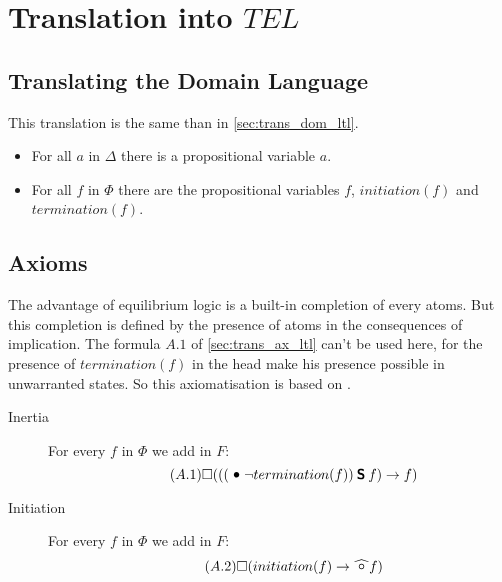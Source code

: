 \section{Translation into $TEL$}\label{sec:translation_e}

\subsection{Translating the Domain Language}

This translation is the same than in \ref{sec:trans_dom_ltl}.

\begin{itemize}
  \item For all $a$ in $\Delta$ there is a propositional variable $a$.
  \item For all $f$ in $\Phi$ there are the propositional variables $f$, $initiation(f)$ and $termination(f)$.
\end{itemize}

\subsection{Axioms}

The advantage of equilibrium logic is a built-in completion of every atoms.
But this completion is defined by the presence of atoms in the consequences of implication.
The formula $A.1$ of \ref{sec:trans_ax_ltl} can't be used here, for the presence of $termination(f)$ in the head make his presence possible in unwarranted states.
So this axiomatisation is based on \label{sec:sec}.

\begin{description}
  \item[Inertia]
    For every $f$ in $\Phi$ we add in $F$:
    \begin{equation}\tag{$A.1$}\label{sec:sec}
      \alwaysF(((\previous \neg termination(f)) \since f) \rightarrow f)
    \end{equation}
  \item[Initiation]
    For every $f$ in $\Phi$ we add in $F$:
    \begin{equation}\tag{$A.2$}
      \alwaysF(initiation(f)\rightarrow\wnext f)
    \end{equation}
\end{description}

